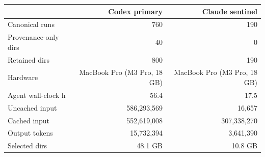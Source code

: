 \begin{tabular}{lrr}
\toprule
 & Codex primary & Claude sentinel \\
\midrule
Canonical runs & 760 & 190 \\
Provenance-only dirs & 40 & 0 \\
Retained dirs & 800 & 190 \\
Hardware & MacBook Pro (M3 Pro, 18 GB) & MacBook Pro (M3 Pro, 18 GB) \\
Agent wall-clock h & 56.4 & 17.5 \\
Uncached input & 586,293,569 & 16,657 \\
Cached input & 552,619,008 & 307,338,270 \\
Output tokens & 15,732,394 & 3,641,390 \\
Selected dirs & 48.1 GB & 10.8 GB \\
\bottomrule
\end{tabular}
